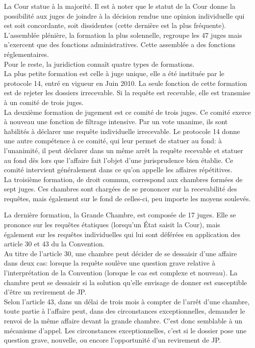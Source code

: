 \documentclass[10pt, a4paper, openany]{book}
\begin{document}
La Cour statue à la majorité. Il est à noter que le statut de la Cour donne la possibilité aux juges de joindre à la décision rendue une opinion individuelle qui est soit concordante, soit dissidentes (cette dernière est la plus fréquente). \\
L'assemblée plénière, la formation la plus solennelle, regroupe les 47 juges mais n'exercent que des fonctions administratives. Cette assemblée a des fonctions réglementaires. \\
Pour le reste, la juridiction connaît quatre types de formations. \\
La plus petite formation est celle à juge unique, elle a été instituée par le protocole 14, entré en vigueur en Juin 2010. La seule fonction de cette formation est de rejeter les dossiers irrecevable. Si la requête est recevable, elle est transmise à un comité de trois juges. \\
La deuxième formation de jugement est ce comité de trois juges. Ce comité exerce à nouveau une fonction de filtrage intensive. Par un vote unanime, ils sont habilités à déclarer une requête individuelle irrecevable. Le protocole 14 donne une autre compétence à ce comité, qui leur permet de statuer au fond: à l'unanimité, il peut déclarer dans un même arrêt la requête recevable et statuer au fond dès lors que l'affaire fait l'objet d'une jurisprudence bien établie. Ce comité intervient généralement dans ce qu'on appelle les affaires répétitives. \\
La troisième formation, de droit commun, correspond aux chambres formées de sept juges. Ces chambres sont chargées de se prononcer sur la recevabilité des requêtes, mais également sur le fond de celles-ci, peu importe les moyens soulevés.


La dernière formation, la Grande Chambre, est composée de 17 juges. Elle se prononce sur les requêtes étatiques (lorsqu'un État saisit la Cour), mais également sur les requêtes individuelles qui lui sont déférées en application des article 30 et 43 du la Convention. \\
Au titre de l'article 30, une chambre peut décider de se dessaisir d'une affaire dans deux cas: lorsque la requête soulève une question grave relative à l'interprétation de la Convention (lorsque le cas est complexe et nouveau). La chambre peut se dessaisir si la solution qu'elle envisage de donner est susceptible d'être un revirement de JP. \\
Selon l'article 43, dans un délai de trois mois à compter de l'arrêt d'une chambre, toute partie à l'affaire peut, dans des circonstances exceptionnelles, demander le renvoi de la même affaire devant la grande chambre. C'est donc semblable à un mécanisme d'appel. Les circonstances exceptionnelles, c'est si le dossier pose une question grave, nouvelle, ou encore l'opportunité d'un revirement de JP. 
\end{document}
